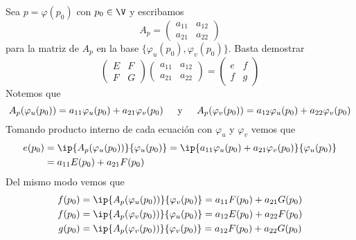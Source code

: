 \documentclass{article}
\begin{document}
\begin{dem}
    Sea $p=\varphi(p_{0})$ con $p_{0}\in\V$ y escribamos
    \begin{equation*}
        A_{p}=\begin{pmatrix}
            a_{11} & a_{12} \\
            a_{21} & a_{22}
        \end{pmatrix}
    \end{equation*}
    para la matriz de $A_{p}$ en la base $\{\varphi_{u}(p_{0}),\varphi_{v}(p_{0})\}$. 
    Basta demostrar
    \begin{equation*}
        \begin{pmatrix}
            E & F \\
            F & G
        \end{pmatrix}\begin{pmatrix}
            a_{11} & a_{12} \\
            a_{21} & a_{22}
        \end{pmatrix}=\begin{pmatrix}
            e & f \\
            f & g
        \end{pmatrix}
    \end{equation*}
    Notemos que
    \begin{equation*}
        A_{p}(\varphi_{u}(p_{0}))=a_{11}\varphi_{u}(p_{0})+a_{21}\varphi_{v}(p_{0})
        \hspace{4mm}\text{ y }\hspace{4mm}
        A_{p}(\varphi_{v}(p_{0}))=a_{12}\varphi_{u}(p_{0})+a_{22}\varphi_{v}(p_{0})
    \end{equation*}
    Tomando producto interno de cada ecuación con $\varphi_{u}$ y $\varphi_{v}$ vemos que
    \begin{align*}
        e(p_{0}) &= \ip{A_{p}(\varphi_{u}(p_{0}))}{\varphi_{u}(p_{0})}=
        \ip{a_{11}\varphi_{u}(p_{0})+a_{21}\varphi_{v}(p_{0})}{\varphi_{u}(p_{0})} \\
        &= a_{11}E(p_{0})+a_{21}F(p_{0})
    \end{align*}
    Del mismo modo vemos que
    \begin{align*}
        f(p_{0}) &= \ip{A_{p}(\varphi_{u}(p_{0}))}{\varphi_{v}(p_{0})}
        =a_{11}F(p_{0})+a_{21}G(p_{0}) \\
        f(p_{0}) &= \ip{A_{p}(\varphi_{v}(p_{0}))}{\varphi_{u}(p_{0})}
        =a_{12}E(p_{0})+a_{22}F(p_{0}) \\
        g(p_{0}) &= \ip{A_{p}(\varphi_{v}(p_{0}))}{\varphi_{v}(p_{0})}
        =a_{12}F(p_{0})+a_{22}G(p_{0})
    \end{align*}
\end{dem}
\end{document}

